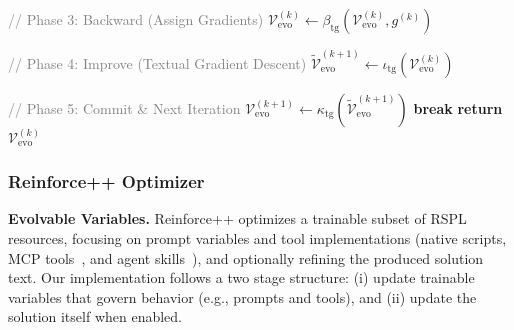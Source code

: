 \begin{algorithm}[t]
\begin{algorithmic}[1]
      \vspace{0.1em}
      \STATE \textcolor{gray}{// Phase 3: Backward (Assign Gradients)}
      \STATE $\mathcal{V}_{\text{evo}}^{(k)} \leftarrow \beta_{\mathrm{tg}}(\mathcal{V}_{\text{evo}}^{(k)}, g^{(k)})$ 
      
      \vspace{0.1em}
      \STATE \textcolor{gray}{// Phase 4: Improve (Textual Gradient Descent)}
      \STATE $\widetilde{\mathcal{V}}_{\text{evo}}^{(k+1)} \leftarrow \iota_{\mathrm{tg}}(\mathcal{V}_{\text{evo}}^{(k)})$ 
      
      \vspace{0.1em}
      \STATE \textcolor{gray}{// Phase 5: Commit \& Next Iteration}
      \STATE $\mathcal{V}_{\text{evo}}^{(k+1)} \leftarrow \kappa_{\mathrm{tg}}(\widetilde{\mathcal{V}}_{\text{evo}}^{(k+1)})$ 
          \STATE \textbf{break}
      \ENDIF
  \ENDFOR
  \STATE \textbf{return} $\mathcal{V}_{\text{evo}}^{(k)}$
  \end{algorithmic}
  \end{algorithm}

\subsubsection{Reinforce++ Optimizer}

\textbf{Evolvable Variables.}
Reinforce++ optimizes a trainable subset of RSPL resources, focusing on prompt variables and tool implementations (native scripts, MCP tools~\citep{anthropic2025}, and agent skills~\citep{anthropic2025agentskills}), and optionally refining the produced solution text. Our implementation follows a two stage structure: (i) update trainable variables that govern behavior (e.g., prompts and tools), and (ii) update the solution itself when enabled.

